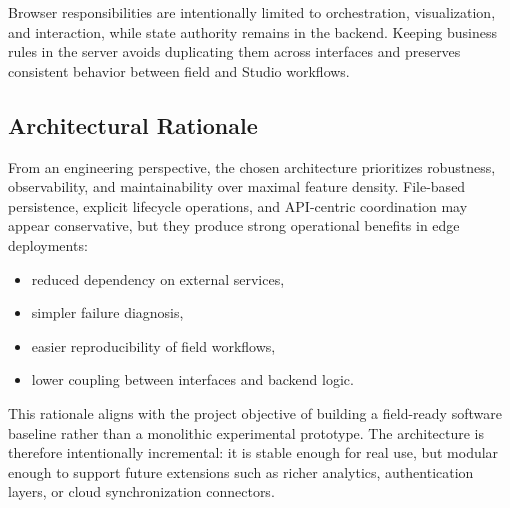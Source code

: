 Browser responsibilities are intentionally limited to orchestration, visualization, and interaction, while state authority remains in the backend. Keeping business rules in the server avoids duplicating them across interfaces and preserves consistent behavior between field and Studio workflows.

\subsection{Architectural Rationale}
From an engineering perspective, the chosen architecture prioritizes robustness, observability, and maintainability over maximal feature density. File-based persistence, explicit lifecycle operations, and API-centric coordination may appear conservative, but they produce strong operational benefits in edge deployments:
\begin{itemize}
  \item reduced dependency on external services,
  \item simpler failure diagnosis,
  \item easier reproducibility of field workflows,
  \item lower coupling between interfaces and backend logic.
\end{itemize}

This rationale aligns with the project objective of building a field-ready software baseline rather than a monolithic experimental prototype. The architecture is therefore intentionally incremental: it is stable enough for real use, but modular enough to support future extensions such as richer analytics, authentication layers, or cloud synchronization connectors.
